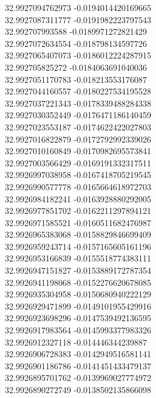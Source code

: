 {32.9927094762973	-0.0194014420169665\\
32.9927087311777	-0.0191982223797543\\
32.992707993588	-0.0189971272821429\\
32.9927072634554	-0.018798134597726\\
32.9927065407073	-0.0186012224287915\\
32.992705825272	-0.0184063691040036\\
32.9927051170783	-0.018213553176087\\
32.9927044160557	-0.0180227534195528\\
32.9927037221343	-0.0178339488284338\\
32.9927030352449	-0.0176471186140459\\
32.9927023553187	-0.0174622422027803\\
32.9927016822879	-0.0172792992339026\\
32.9927010160849	-0.0170982695573841\\
32.9927003566429	-0.0169191332317511\\
32.9926997038958	-0.0167418705219545\\
32.9926990577778	-0.0165664618972703\\
32.9926984182241	-0.0163928880292005\\
32.9926977851702	-0.0162211297894121\\
32.9926971585521	-0.0160511682476987\\
32.9926965383068	-0.0158829846699409\\
32.9926959243714	-0.0157165605161196\\
32.9926953166839	-0.0155518774383111\\
32.9926947151827	-0.0153889172787354\\
32.9926941198068	-0.0152276620678085\\
32.9926935304958	-0.0150680940222129\\
32.9926929471899	-0.0149101955429916\\
32.9926923698296	-0.0147539492136595\\
32.9926917983564	-0.0145993377983326\\
32.9926912327118	-0.014446344239887\\
32.9926906728383	-0.0142949516581141\\
32.9926901186786	-0.0141451433479137\\
32.9926895701762	-0.0139969027774972\\
32.9926890272749	-0.0138502135866098\\
}
